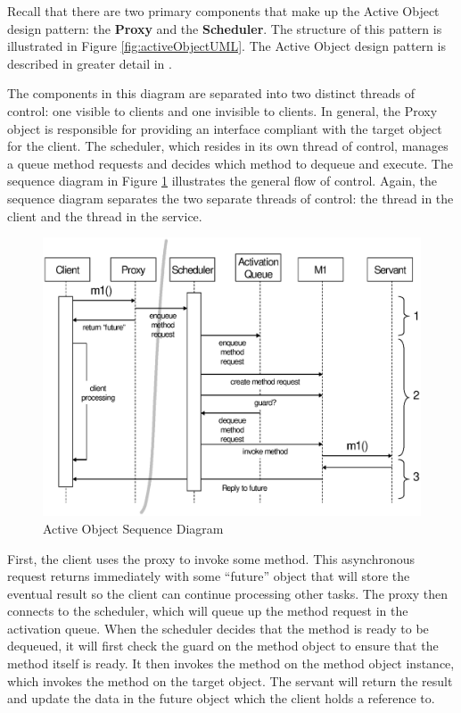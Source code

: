 Recall that there are two primary components that make up the Active Object
design pattern: the \textbf{Proxy} and the \textbf{Scheduler}. The structure of
this pattern is illustrated in Figure \ref{fig:activeObjectUML}. The Active
Object design pattern is described in greater detail in \cite{Schmidt96}.

The components in this diagram are separated into two distinct threads of
control: one visible to clients and one invisible to clients. In general, the
Proxy object is responsible for providing an interface compliant with the target
object for the client. The scheduler, which resides in its own thread of
control, manages a queue method requests and decides which method to dequeue
and execute. The sequence diagram in Figure \ref{fig:activeObjectSequence}
illustrates the general flow of control. Again, the sequence diagram
separates the two separate threads of control: the thread in the client and the
thread in the service.

\begin{figure}[t]
  \begin{center}
  \includegraphics[width=\textwidth]{images/activeObjectSequence}
  \caption{Active Object Sequence Diagram}
  \label{fig:activeObjectSequence}
  \end{center}
\end{figure}

First, the client uses the proxy to invoke some method. This asynchronous  
request returns immediately with some ``future'' object that will store the
eventual result so the client can continue processing other tasks. The proxy
then connects to the scheduler, which will queue up the method request in the
activation queue. When the scheduler decides that the method is ready to be
dequeued, it will first check the guard on the method object to ensure that the
method itself is ready. It then invokes the method on the method object
instance, which invokes the method on the target object. The servant will return
the result and update the data in the future object which the client holds a
reference to.


